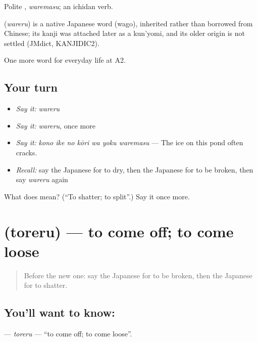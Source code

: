 Polite \textbf{}, \emph{waremasu}; an ichidan verb.

\begin{cousinweb}
\textbf{} (\emph{wareru}) is a native Japanese word (wago), inherited rather than borrowed from Chinese; its kanji was attached later as a kun'yomi, and its older origin is not settled (JMdict, KANJIDIC2).
\end{cousinweb}

\begin{grammarlens}[title={What you've built}]
One more word for everyday life at A2.
\end{grammarlens}

\subsection*{Your turn}
\begin{itemize}
\raggedright
  \item \emph{Say it:} \emph{wareru}
  \item \emph{Say it:} \emph{wareru}, once more
  \item \emph{Say it:} \emph{kono ike no kōri wa yoku waremasu} — The ice on this pond often cracks.
  \item \emph{Recall:} say the Japanese for to dry, then the Japanese for to be broken, then say \emph{wareru} again
\end{itemize}

\begin{tcolorbox}[breakable,colback=teal!4,colframe=teal!35!black,title={Before you move on}]
What does  mean? (\textquotedblleft{}To shatter; to split\textquotedblright{}.) Say it once more.
\end{tcolorbox}
\section[\texorpdfstring{\ja{とれる} (toreru)}{とれる (toreru)}]{ (toreru) — to come off; to come loose}

\label{lesson:JA-C162-toreru}



\begin{quote}
Before the new one: say the Japanese for to be broken, then the Japanese for to shatter.
\end{quote}

\subsection*{You'll want to know: }
\textbf{} — \emph{toreru} — \textquotedblleft{}to come off; to come loose\textquotedblright{}.

